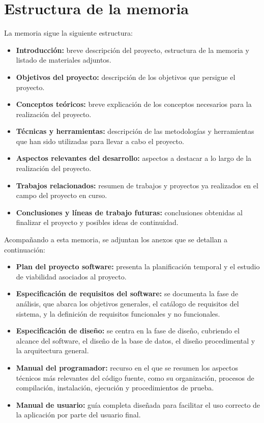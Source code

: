 \section{Estructura de la memoria}\label{estructura-de-la-memoria}

La memoria sigue la siguiente estructura:

\begin{itemize}
\tightlist
\item
  \textbf{Introducción:} breve descripción del proyecto, estructura de la memoria y listado de materiales adjuntos.
\item
  \textbf{Objetivos del proyecto:} descripción de los objetivos que persigue el proyecto.
\item
  \textbf{Conceptos teóricos:} breve explicación de los conceptos necesarios para la realización del proyecto.
\item
  \textbf{Técnicas y herramientas:} descripción de las metodologías y herramientas que han sido utilizadas para llevar a cabo el proyecto.
\item
  \textbf{Aspectos relevantes del desarrollo:} aspectos a destacar a lo largo de la realización del proyecto.
\item
  \textbf{Trabajos relacionados:} resumen de trabajos y proyectos ya realizados en el campo del proyecto en curso.
\item
  \textbf{Conclusiones y líneas de trabajo futuras:} conclusiones obtenidas al finalizar el proyecto y posibles ideas de continuidad.
\end{itemize}

Acompañando a esta memoria, se adjuntan los anexos que se detallan a continuación:

\begin{itemize}
\tightlist
\item
  \textbf{Plan del proyecto software:} presenta la planificación temporal y el estudio de viabilidad asociados al proyecto.
\item
  \textbf{Especificación de requisitos del software:} se documenta la fase de análisis, que abarca los objetivos generales, el catálogo de requisitos del sistema, y la definición de requisitos funcionales y no funcionales.
\item
  \textbf{Especificación de diseño:} se centra en la fase de diseño, cubriendo el alcance del software, el diseño de la base de datos, el diseño procedimental y la arquitectura general.
\item
  \textbf{Manual del programador:} recurso en el que se resumen los aspectos técnicos más relevantes del código fuente, como su organización, procesos de compilación, instalación, ejecución y procedimientos de prueba.
\item
  \textbf{Manual de usuario:} guía completa diseñada para facilitar el uso correcto de la aplicación por parte del usuario final.
\end{itemize}

